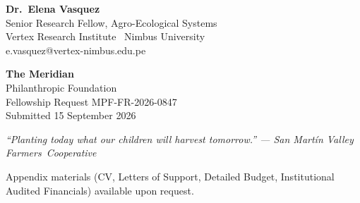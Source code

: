 \documentclass[paper=a4,fontsize=10pt,parskip=half-,DIV=calc]{scrartcl}
\begin{document}
\vspace{14pt}

\begin{tcolorbox}[
  colback=meridianNavy,
  colframe=meridianNavy,
  boxrule=0pt,
  arc=4pt,
  left=16pt,
  right=16pt,
  top=14pt,
  bottom=14pt
]
  \begin{minipage}[t]{0.55\textwidth}
    {\color{white}\normalsize\sffamily\bfseries Dr.\ Elena Vasquez}\\[3pt]
    {\color{goldAccent}\small Senior Research Fellow, Agro-Ecological Systems}\\[2pt]
    {\color{white!70}\footnotesize Vertex Research Institute \textbar\ Nimbus University}\\[2pt]
    {\color{white!70}\footnotesize e.vasquez@vertex-nimbus.edu.pe}
  \end{minipage}
  \hfill
  \begin{minipage}[t]{0.38\textwidth}
    \raggedleft
    {\color{goldAccent}\normalsize\sffamily\bfseries The Meridian}\\[2pt]
    {\color{white}\small Philanthropic Foundation}\\[4pt]
    {\color{white!70}\footnotesize Fellowship Request MPF-FR-2026-0847}\\[2pt]
    {\color{white!70}\footnotesize Submitted 15 September 2026}
  \end{minipage}
  \par
  \vspace{6pt}
  \vspace{4pt}
  {\centering\color{white!60}\footnotesize\itshape\enquote{Planting today what our children will harvest tomorrow.} --- San Mart\'{i}n Valley Farmers\textquotesingle\ Cooperative\par}
\end{tcolorbox}

\vspace{8pt}

\begin{center}
  {\footnotesize\color{charcoal!50}\sffamily Appendix materials (CV, Letters of Support, Detailed Budget, Institutional Audited Financials) available upon request.}
\end{center}
\end{document}
